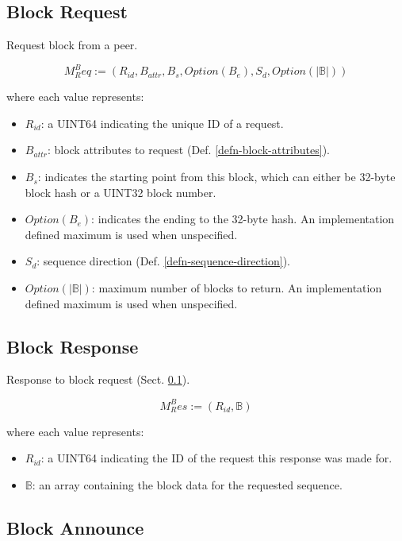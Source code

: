 \documentclass{book}
\begin{document}
\subsection{Block Request}\label{sect-block-request}

Request block from a peer.

\[
    M^B_Req := (R_{id}, B_{attr}, B_s, Option(B_e), S_d, Option(|\mathbb{B}|))
\]

where each value represents:

\begin{itemize}
    \item $R_{id}$: a UINT64 indicating the unique ID of a request.
    \item $B_{attr}$: block attributes to request (Def.
    \ref{defn-block-attributes}).
    \item $B_s$: indicates the starting point from this block, which can either
    be 32-byte block hash or a UINT32 block number.
    \item $Option(B_e)$: indicates the ending to the 32-byte hash. An
    implementation defined maximum is used when unspecified.
    \item $S_d$: sequence direction (Def. \ref{defn-sequence-direction}). 
    \item $Option(|\mathbb{B}|)$: maximum number of blocks to return. An implementation
    defined maximum is used when unspecified.
\end{itemize}

\subsection{Block Response}

Response to block request (Sect. \ref{sect-block-request}).

\[
    M^B_Res := (R_{id}, \mathbb{B})
\]

where each value represents:

\begin{itemize}
    \item $R_{id}$: a UINT64 indicating the ID of the request this response was
    made for.
    \item $\mathbb{B}$: an array containing the block data for the requested
    sequence.
\end{itemize}

\subsection{Block Announce}
\end{document}
